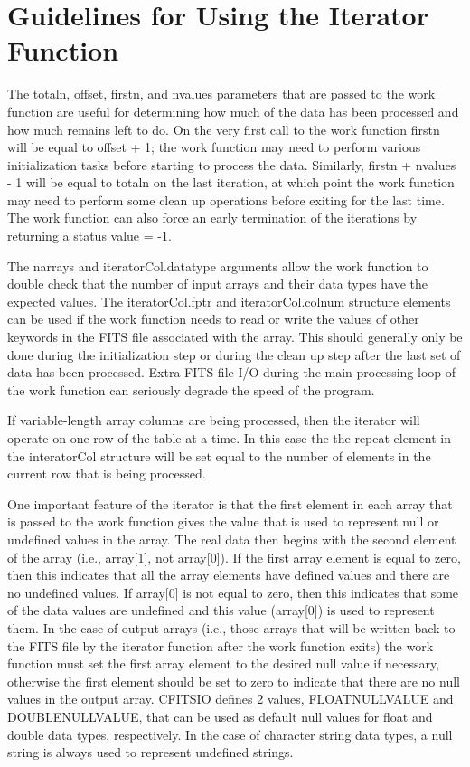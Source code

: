 \documentclass[11pt]{book}
\begin{document}
\section{Guidelines for Using the Iterator Function}

The totaln, offset, firstn, and nvalues parameters that are passed to
the work function are useful for determining how much of the data has
been processed and how much remains left to do.  On the very first call
to the work function firstn will be equal to offset + 1;  the work
function may need to perform various initialization tasks before
starting to  process the data. Similarly, firstn + nvalues - 1 will be
equal to totaln on the last iteration, at which point the work function
may need to perform some clean up operations before exiting for the
last time.  The work function can also force an early termination of
the iterations by returning a status value = -1.

The narrays and iteratorCol.datatype arguments allow the work function
to double check that the number of input arrays and their data types
have the expected values.  The iteratorCol.fptr and iteratorCol.colnum
structure elements can be used if the work function needs to read or
write the values of other keywords in the FITS file associated with
the array.  This should generally only be done during the
initialization step or during the clean up step after the last set of
data has been processed.  Extra FITS file I/O during the main
processing loop of the work function can seriously degrade the speed of
the program.

If variable-length array columns are being processed, then the iterator
will operate on one row of the table at a time.  In this case the
the repeat element in the interatorCol structure will be set equal to
the number of elements in the current row that is being processed.

One important feature of the iterator is that the first element in each
array that is passed to the work function gives the value that is used
to represent null or undefined values in the array.  The real data then
begins with the second element of the array (i.e., array[1], not
array[0]).  If the first array element is equal to zero, then this
indicates that all the array elements have defined values and there are
no undefined values.  If array[0] is not equal to zero, then this
indicates that some of the data values are undefined and this value
(array[0]) is used to represent them.  In the case of output arrays
(i.e., those arrays that will be written back to the FITS file by the
iterator function after the work function exits) the work function must
set the first array element to the desired null value if necessary,
otherwise the first element should be set to zero to indicate that
there are no null values in the output array.  CFITSIO defines 2
values, FLOATNULLVALUE and DOUBLENULLVALUE, that can be used as default
null values for float and double data types, respectively.  In the case
of character string data types, a null string is always used to
represent undefined strings.
\end{document}
